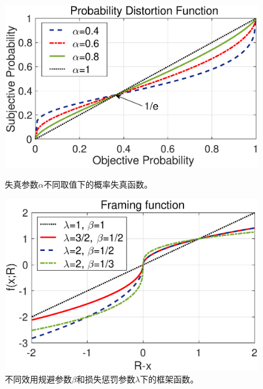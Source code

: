 \begin{figure}
\centering
\includegraphics[scale=0.6]{./pic/dist_func.eps}
\caption{失真参数$\alpha$不同取值下的概率失真函数。}\label{fg:dist_func}
\vspace{0.1cm}
\centering
\includegraphics[scale=0.6]{./pic/fram_func.eps}
\caption{不同效用规避参数$\beta$和损失惩罚参数$\lambda$下的框架函数。}\label{fg:fram_func}
\end{figure}

